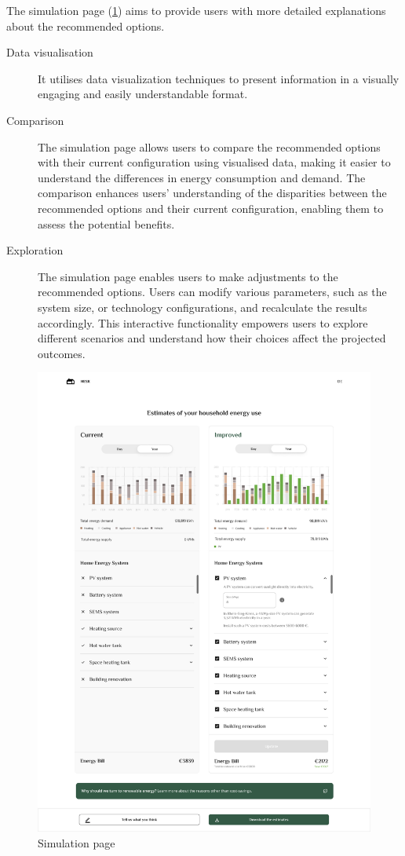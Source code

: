 The simulation page (\ref{fig:explanation}) aims to provide users with more detailed explanations about the recommended options.
\begin{description}
  \item[Data visualisation] It utilises data visualization techniques to present information in a visually engaging and easily understandable format.
  \item[Comparison] The simulation page allows users to compare the recommended options with their current configuration using visualised data, making it easier to understand the differences in energy consumption and demand. 
    The comparison enhances users' understanding of the disparities between the recommended options and their current configuration, enabling them to assess the potential benefits. 
  \item[Exploration] The simulation page enables users to make adjustments to the recommended options. 
    Users can modify various parameters, such as the system size, or technology configurations, and recalculate the results accordingly. 
    This interactive functionality empowers users to explore different scenarios and understand how their choices affect the projected outcomes. 
\end{description}
\begin{figure}[h!]
  \centering
  \includegraphics[width=\textwidth]{Images/explanation.png}
  \caption{Simulation page}
  \label{fig:explanation}
\end{figure}


